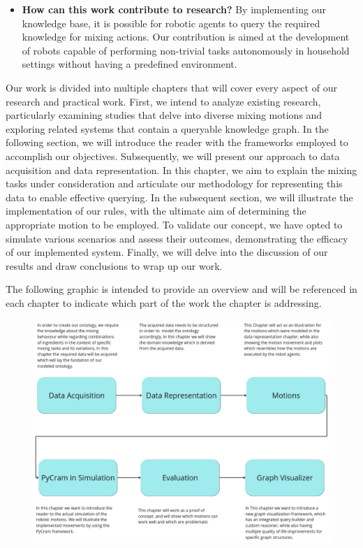 \begin{itemize}
    \item \textbf{How can this work contribute to research?} By implementing our knowledge base, it is possible for robotic agents to query the required knowledge for mixing actions. Our contribution is aimed at the development of robots capable of performing non-trivial tasks autonomously in household settings without having a predefined environment.
\end{itemize}


Our work is divided into multiple chapters that will cover every aspect of our research and practical work.
First, we intend to analyze existing research, particularly examining studies that delve into diverse mixing motions and exploring related systems that contain a queryable knowledge graph.
In the following section, we will introduce the reader with the frameworks employed to accomplish our objectives.	
Subsequently, we will present our approach to data acquisition and data representation.
In this chapter, we aim to explain the mixing tasks under consideration and articulate our methodology for representing this data to enable effective querying.
In the subsequent section, we will illustrate the implementation of our rules, with the ultimate aim of determining the appropriate motion to be employed.
To validate our concept, we have opted to simulate various scenarios and assess their outcomes, demonstrating the efficacy of our implemented system.
Finally, we will delve into the discussion of our results and draw conclusions to wrap up our work.

The following graphic is intended to provide an overview and will be referenced in each chapter to indicate which part of the work the chapter is addressing.
\begin{figure}[H]
    \includegraphics[scale=0.36]{Graphics/overview.jpg}
\end{figure}